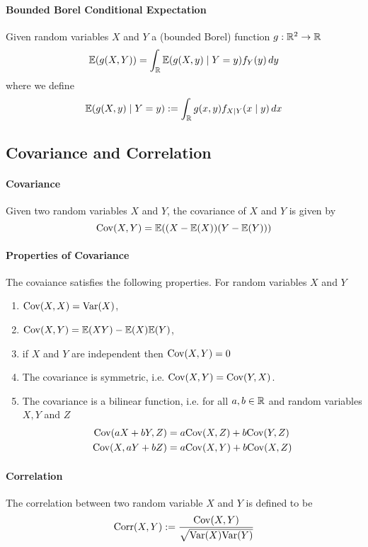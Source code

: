 \paragraph{Bounded Borel Conditional Expectation}
Given random variables \(X\) and \(Y\) a (bounded Borel) function \(g: \mathbb{R}^2 \to \mathbb{R}\)
\[\mathbb{E}(g(X,Y)) = \int_{\mathbb{R}} \mathbb{E}(g(X,y) \mid Y = y) f_Y(y) \, dy\]
where we define
\[\mathbb{E}(g(X,y) \mid Y = y) := \int_{\mathbb{R}} g(x, y)f_{X \mid Y}(x \mid y) \, dx\]

\subsection{Covariance and Correlation}
\paragraph{Covariance}
Given two random variables \(X\) and \(Y\), the covariance of \(X\) and \(Y\) is given by
\[\mathrm{Cov}(X,Y) = \mathbb{E}((X-\mathbb{E}(X))(Y-\mathbb{E}(Y)))\]

\paragraph{Properties of Covariance}
The covaiance satisfies the following properties. For random variables \(X\) and \(Y\)
\begin{enumerate}
    \item \(\mathrm{Cov}(X,X) = \mathrm{Var}(X)\),
    \item \(\mathrm{Cov}(X, Y) = \mathbb{E}(XY) - \mathbb{E}(X)\mathbb{E}(Y)\),
    \item if \(X\) and \(Y\) are independent then \(\mathrm{Cov}(X,Y) = 0\)
    \item The covariance is symmetric, i.e. \(\mathrm{Cov}(X,Y) = \mathrm{Cov}(Y,X)\).
    \item The covariance is a bilinear function, i.e. for all \(a, b \in \mathbb{R}\) and random variables \(X, Y\) and \(Z\)
    \begin{align*}
        \mathrm{Cov}(aX + bY, Z) & = a\mathrm{Cov}(X, Z) + b\mathrm{Cov}(Y, Z) \\
        \mathrm{Cov}(X, aY + bZ) & = a\mathrm{Cov}(X,Y) + b\mathrm{Cov}(X, Z)
    \end{align*}
\end{enumerate}

\paragraph{Correlation}
The correlation between two random variable \(X\) and \(Y\) is defined to be
\[\mathrm{Corr}(X,Y) := \frac{\mathrm{Cov}(X,Y)}{\sqrt{\mathrm{Var}(X)\mathrm{Var}(Y)}}\]

